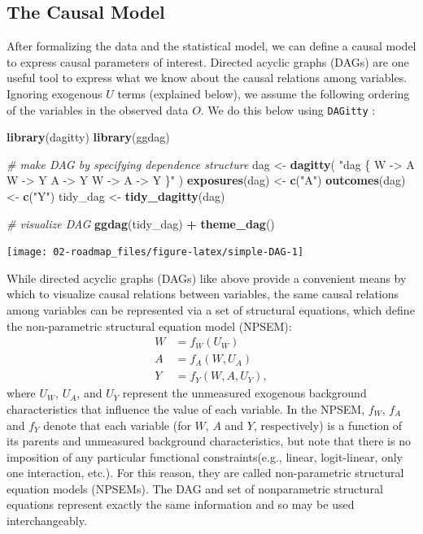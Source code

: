 \documentclass[12pt, krantz2,]{book}
\newenvironment{Shaded}{\begin{snugshade}}{\end{snugshade}}
\newcommand{\CommentTok}[1]{\textcolor[rgb]{0.56,0.35,0.01}{\textit{#1}}}
\newcommand{\KeywordTok}[1]{\textcolor[rgb]{0.13,0.29,0.53}{\textbf{#1}}}
\newcommand{\NormalTok}[1]{#1}
\newcommand{\OperatorTok}[1]{\textcolor[rgb]{0.81,0.36,0.00}{\textbf{#1}}}
\newcommand{\StringTok}[1]{\textcolor[rgb]{0.31,0.60,0.02}{#1}}
\theoremstyle{definition}
\theoremstyle{definition}
\theoremstyle{definition}
\newcommand{\1}{\mathbbm{1}}
\begin{document}
\hypertarget{the-causal-model}{%
\subsection*{The Causal Model}\label{the-causal-model}}


After formalizing the data and the statistical model, we can define a causal
model to express causal parameters of interest. Directed acyclic graphs (DAGs)
are one useful tool to express what we know about the causal relations among
variables. Ignoring exogenous \(U\) terms (explained below), we assume the
following ordering of the variables in the observed data \(O\). We do this below
using \texttt{DAGitty} \citep{textor2011dagitty}:

\begin{Shaded}
\begin{Highlighting}[]
\KeywordTok{library}\NormalTok{(dagitty)}
\KeywordTok{library}\NormalTok{(ggdag)}

\CommentTok{# make DAG by specifying dependence structure}
\NormalTok{dag <-}\StringTok{ }\KeywordTok{dagitty}\NormalTok{(}
  \StringTok{"dag \{}
\StringTok{    W -> A}
\StringTok{    W -> Y}
\StringTok{    A -> Y}
\StringTok{    W -> A -> Y}
\StringTok{  \}"}
\NormalTok{)}
\KeywordTok{exposures}\NormalTok{(dag) <-}\StringTok{ }\KeywordTok{c}\NormalTok{(}\StringTok{"A"}\NormalTok{)}
\KeywordTok{outcomes}\NormalTok{(dag) <-}\StringTok{ }\KeywordTok{c}\NormalTok{(}\StringTok{"Y"}\NormalTok{)}
\NormalTok{tidy_dag <-}\StringTok{ }\KeywordTok{tidy_dagitty}\NormalTok{(dag)}

\CommentTok{# visualize DAG}
\KeywordTok{ggdag}\NormalTok{(tidy_dag) }\OperatorTok{+}
\StringTok{  }\KeywordTok{theme_dag}\NormalTok{()}
\end{Highlighting}
\end{Shaded}

\begin{center}\texttt{[image: 02-roadmap\_files/figure-latex/simple-DAG-1]} \end{center}

While directed acyclic graphs (DAGs) like above provide a convenient means by
which to visualize causal relations between variables, the same causal relations
among variables can be represented via a set of structural equations, which
define the non-parametric structural equation model (NPSEM):
\begin{align*}
  W &= f_W(U_W) \\
  A &= f_A(W, U_A) \\
  Y &= f_Y(W, A, U_Y),
\end{align*}
where \(U_W\), \(U_A\), and \(U_Y\) represent the unmeasured exogenous background
characteristics that influence the value of each variable. In the NPSEM, \(f_W\),
\(f_A\) and \(f_Y\) denote that each variable (for \(W\), \(A\) and \(Y\), respectively)
is a function of its parents and unmeasured background characteristics, but note
that there is no imposition of any particular functional constraints(e.g.,
linear, logit-linear, only one interaction, etc.). For this reason, they are
called non-parametric structural equation models (NPSEMs). The DAG and set of
nonparametric structural equations represent exactly the same information and so
may be used interchangeably.
\end{document}
